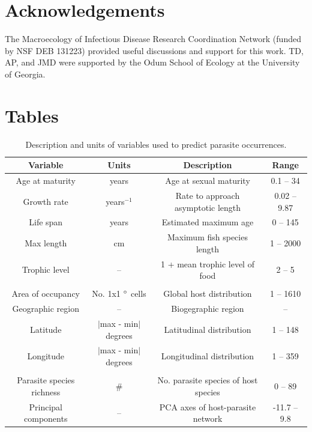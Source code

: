 \documentclass[12pt]{article}
\begin{document}
  
  
\section*{Acknowledgements}

The Macroecology of Infectious Disease Research Coordination Network (funded by NSF DEB 131223) provided useful discussions and support for this work. TD, AP, and JMD were supported by the Odum School of Ecology at the University of Georgia.







\newpage
\section*{Tables}
  \begin{table}[!h]
  \caption{Description and units of variables used to predict parasite occurrences.}
  \vspace{0.1cm}
  \begin{tabular}{cccc}
\hline
\textbf{Variable} &   \textbf{Units} &   \textbf{Description} &   \textbf{Range} \\ 
\hline
Age at maturity & years        & Age at sexual maturity  & 0.1 -- 34  \\ 
Growth rate     & years$^{-1}$ & Rate to approach asymptotic length & 0.02 -- 9.87 \\ 
Life span       & years        & Estimated maximum age & 0 -- 145  \\ 
Max length      & cm           & Maximum fish species length  & 1 -- 2000 \\ 
Trophic level   & --           & 1 + mean trophic level of food  &  2 -- 5\\ 
 & & &  \\
Area of occupancy   & No. 1x1 $\degree$ cells &  Global host distribution  & 1 -- 1610    \\
Geographic region   & --       &   Biogegraphic region        & -- \\ 
Latitude            & $\lvert$max - min$\rvert$ degrees & Latitudinal distribution         & 1 -- 148 \\ 
Longitude           & $\lvert$max - min$\rvert$ degrees & Longitudinal distribution        & 1 -- 359 \\ 
 & & &  \\
Parasite species richness & \# & No. parasite species of host species &  0 -- 89 \\
Principal components     &  -- & PCA axes of host-parasite network   & -11.7 -- 9.8 \\
\hline
  \end{tabular}
  \label{tab:traits}
\end{table}
\end{document}
